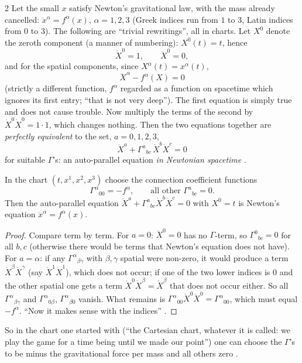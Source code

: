 \begin{paracol}{2}
Let the small $x$ satisfy Newton's gravitational law, with the mass already cancelled: $\ddot x^\alpha=f^\alpha(x)$, $\alpha=1,2,3$ (Greek indices run from $1$ to $3$, Latin indices from $0$ to $3$). The following are ``trivial rewritings'', all in charts. Let $X^0$ denote the zeroth component (a manner of numbering): $X^0(t)=t$, hence
\[
  \dot X^0=1,\qquad\ddot X^0=0,
\]
and for the spatial components, since $X^\alpha(t)=x^\alpha(t)$,
\[
  \ddot X^\alpha-f^\alpha(X)=0
\]
(strictly a different function, $f^\alpha$ regarded as a function on spacetime which ignores its first entry; ``that is not very deep''). The first equation is simply true and does not cause trouble. Now multiply the terms of the second by $\dot X^0\dot X^0=1\cdot1$, which changes nothing. Then the two equations together are \emph{perfectly equivalent} to the set, $a=0,1,2,3$,
\[
  \ddot X^a+\Gamma^a{}_{bc}\,\dot X^b\dot X^c=0
\]
for suitable $\Gamma$'s: an auto-parallel equation \emph{in Newtonian spacetime} .

\begin{proposition}\label{prop:c09-gamma}
In the chart $(t,x^1,x^2,x^3)$ choose the connection coefficient functions
\[
  \Gamma^\alpha{}_{00}=-f^\alpha,\qquad\text{all other }\Gamma^a{}_{bc}=0.
\]
Then the auto-parallel equation $\ddot X^a+\Gamma^a{}_{bc}\dot X^b\dot X^c=0$ with $X^0=t$ is Newton's equation $\ddot x^\alpha=f^\alpha(x)$.
\end{proposition}
\begin{proof}
Compare term by term. For $a=0$: $\ddot X^0=0$ has no $\Gamma$-term, so $\Gamma^0{}_{bc}=0$ for all $b,c$ (otherwise there would be terms that Newton's equation does not have). For $a=\alpha$: if any $\Gamma^\alpha{}_{\beta\gamma}$ with $\beta,\gamma$ spatial were non-zero, it would produce a term $\dot X^\beta\dot X^\gamma$ (say $\dot X^1\dot X^1$), which does not occur; if one of the two lower indices is $0$ and the other spatial one gets a term $\dot X^0\dot X^\beta=\dot X^\beta$ that does not occur either. So all $\Gamma^\alpha{}_{\beta\gamma}$ and $\Gamma^\alpha{}_{0\beta}$, $\Gamma^\alpha{}_{\beta0}$ vanish. What remains is $\Gamma^\alpha{}_{00}\dot X^0\dot X^0=\Gamma^\alpha{}_{00}$, which must equal $-f^\alpha$. ``Now it makes sense with the indices''
.
\end{proof}
So in the chart one started with (``the Cartesian chart, whatever it is called: we play the game for a time being until we made our point'') one can choose the $\Gamma$'s to be minus the gravitational force per mass and all others zero .


\end{paracol}
